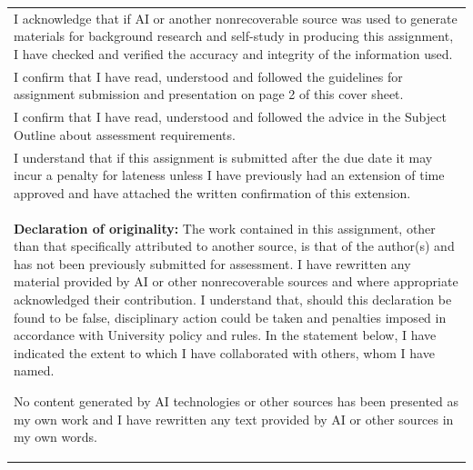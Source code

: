 \documentclass[a4paper,12pt]{article}
\begin{document}
\noindent
\begin{tabularx}{\textwidth}{|>{\raggedright\arraybackslash}X|}
	\hline
	\vspace{0.1cm}
	\small
	\raisebox{-0.1cm}{\makebox[0.5cm][l]{\rule{0.5cm}{0.5cm}}}\hspace{0.1cm}
	I acknowledge that if AI or another nonrecoverable source was used to generate materials for background research and self-study in producing this assignment, I have checked and verified the accuracy and integrity of the information used. \\

	\small
	\raisebox{-0.1cm}{\makebox[0.5cm][l]{\rule{0.5cm}{0.5cm}}}\hspace{0.1cm}
	I confirm that I have read, understood and followed the guidelines for assignment submission and presentation on page 2 of this cover sheet.                                                                                                  \\
	\small
	\raisebox{-0.1cm}{\makebox[0.5cm][l]{\rule{0.5cm}{0.5cm}}}\hspace{0.1cm}
	I confirm that I have read, understood and followed the advice in the Subject Outline about assessment requirements.
	\\
	\small
	\raisebox{-0.1cm}{\makebox[0.5cm][l]{\rule{0.5cm}{0.5cm}}}\hspace{0.1cm}
	I understand that if this assignment is submitted after the due date it may incur a penalty for lateness unless I have previously had an extension of time approved and have attached the written confirmation of this extension.             \\

	\vspace{0.2cm}

	\noindent
	\textbf{Declaration of originality:} \small
	The work contained in this assignment, other than that specifically attributed to another source, is that of the author(s) and has not been previously submitted for assessment. I have rewritten any material provided by AI or other nonrecoverable sources and where appropriate acknowledged their contribution. I understand that, should this declaration be found to be false, disciplinary action could be taken and penalties imposed in accordance with University policy and rules. In the statement below, I have indicated the extent to which I have collaborated with others, whom I have named.

	No content generated by AI technologies or other sources has been presented as my own work and I have rewritten any text provided by AI or other sources in my own words.


\end{tabularx}
\end{document}

